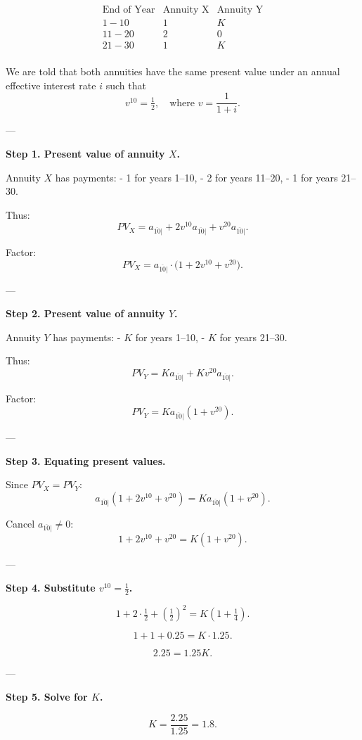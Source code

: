 \documentclass[12pt, a4paper]{article}
\begin{document}
\[
\begin{array}{c|c|c}
\text{End of Year} & \text{Annuity X} & \text{Annuity Y} \\
\hline
1-10 & 1 & K \\
11-20 & 2 & 0 \\
21-30 & 1 & K \\
\end{array}
\]

We are told that both annuities have the same present value under an annual effective interest rate $i$ such that
\[
v^{10} = \tfrac{1}{2}, 
\quad \text{where } v=\frac{1}{1+i}.
\]

---

\textbf{Step 1. Present value of annuity $X$.}

Annuity $X$ has payments:
- 1 for years 1–10,
- 2 for years 11–20,
- 1 for years 21–30.

Thus:
\[
PV_X = a_{\overline{10}|} + 2 v^{10} a_{\overline{10}|} + v^{20} a_{\overline{10}|}.
\]

Factor:
\[
PV_X = a_{\overline{10}|} \cdot \big(1 + 2v^{10} + v^{20}\big).
\]

---

\textbf{Step 2. Present value of annuity $Y$.}

Annuity $Y$ has payments:
- $K$ for years 1–10,
- $K$ for years 21–30.

Thus:
\[
PV_Y = K a_{\overline{10}|} + K v^{20} a_{\overline{10}|}.
\]

Factor:
\[
PV_Y = K a_{\overline{10}|}(1+v^{20}).
\]

---

\textbf{Step 3. Equating present values.}

Since $PV_X = PV_Y$:
\[
a_{\overline{10}|}(1 + 2v^{10} + v^{20}) 
= K a_{\overline{10}|}(1+v^{20}).
\]

Cancel $a_{\overline{10}|} \neq 0$:
\[
1 + 2v^{10} + v^{20} = K(1+v^{20}).
\]

---

\textbf{Step 4. Substitute $v^{10}=\tfrac{1}{2}$.}

\[
1 + 2\cdot \tfrac{1}{2} + \left(\tfrac{1}{2}\right)^2 
= K\left(1 + \tfrac{1}{4}\right).
\]

\[
1 + 1 + 0.25 = K \cdot 1.25.
\]

\[
2.25 = 1.25K.
\]

---

\textbf{Step 5. Solve for $K$.}

\[
K = \frac{2.25}{1.25} = 1.8.
\]
\end{document}
